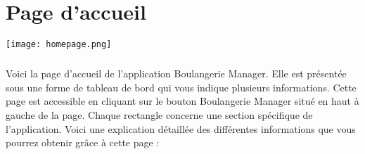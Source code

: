 \chapter{Page d'accueil}

\texttt{[image: homepage.png]}

\paragraph{}
Voici la page d'accueil de l'application Boulangerie Manager. Elle est
présentée sous une forme de tableau de bord qui vous indique plusieurs
informations. Cette page est accessible en cliquant sur le bouton Boulangerie
Manager situé en haut à gauche de la page. Chaque rectangle concerne une
section spécifique de l'application. Voici une explication détaillée des
différentes informations que vous pourrez obtenir grâce à cette page :
